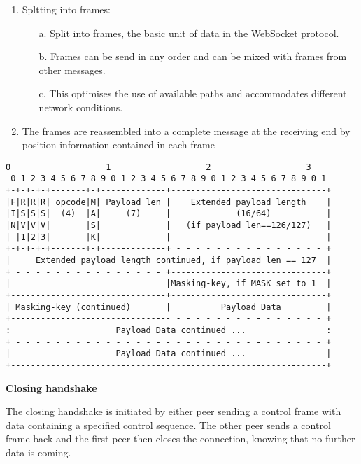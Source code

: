 \begin{enumerate}
  \item Spltting into frames:
        \begin{enumerate}
          \item[a.] Split into frames, the basic unit of data in the WebSocket protocol.
          \item[b.] Frames can be send in any order and can be mixed with frames from other messages.
          \item[c.] This optimises the use of available paths and accommodates different network conditions.
        \end{enumerate}
  \item The frames are reassembled into a complete message at the receiving end by position information contained in each frame
\end{enumerate}

\begin{lstlisting}[caption=Frame format, style=nohighlight]
 0                   1                   2                   3
 0 1 2 3 4 5 6 7 8 9 0 1 2 3 4 5 6 7 8 9 0 1 2 3 4 5 6 7 8 9 0 1
+-+-+-+-+-------+-+-------------+-------------------------------+
|F|R|R|R| opcode|M| Payload len |    Extended payload length    |
|I|S|S|S|  (4)  |A|     (7)     |             (16/64)           |
|N|V|V|V|       |S|             |   (if payload len==126/127)   |
| |1|2|3|       |K|             |                               |
+-+-+-+-+-------+-+-------------+ - - - - - - - - - - - - - - - +
|     Extended payload length continued, if payload len == 127  |
+ - - - - - - - - - - - - - - - +-------------------------------+
|                               |Masking-key, if MASK set to 1  |
+-------------------------------+-------------------------------+
| Masking-key (continued)       |          Payload Data         |
+-------------------------------- - - - - - - - - - - - - - - - +
:                     Payload Data continued ...                :
+ - - - - - - - - - - - - - - - - - - - - - - - - - - - - - - - +
|                     Payload Data continued ...                |
+---------------------------------------------------------------+
\end{lstlisting}

\textbf{Closing handshake}

The closing handshake is initiated by either peer sending a control frame with data containing a specified control sequence. The other peer sends a control frame back and the first peer then closes the connection, knowing that no further data is coming.

